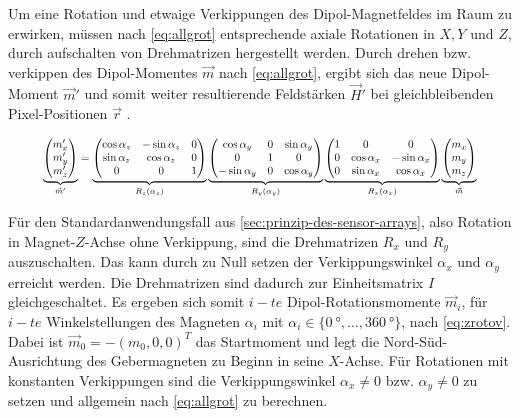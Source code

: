 \clearpage


Um eine Rotation und etwaige Verkippungen des Dipol-Magnetfeldes im Raum zu erwirken, müssen nach \autoref{eq:allgrot} entsprechende axiale Rotationen in $X,Y$ und $Z$, durch aufschalten von Drehmatrizen hergestellt werden. Durch drehen bzw. verkippen des Dipol-Momentes $\vec{m}$ nach \autoref{eq:allgrot}, ergibt sich das neue Dipol-Moment $\vec{m}'$ und somit weiter resultierende Feldstärken $\vec{H}'$ bei gleichbleibenden Pixel-Positionen $\vec{r}$ \cite{Schuethe2019}.


\begin{equation}\label{eq:allgrot}
\resizebox{.9\linewidth}{!}{$%
	\underbrace{
		\begin{pmatrix}
			 m_x' \\
			 m_y' \\
			 m_z' 
		\end{pmatrix}
	}_{\vec{m}'}  =
	\underbrace{
		\begin{pmatrix}
			\cos\alpha_z & -\sin\alpha_z & 0 \\
			\sin\alpha_z &  \cos\alpha_z & 0 \\
			0			 & 0			 & 1
		\end{pmatrix}
	}_{R_z(\alpha_z)}
	\underbrace{
		\begin{pmatrix}
			\cos\alpha_y  & 0 & \sin\alpha_y \\
			0 		      & 1 & 0 \\
			-\sin\alpha_y & 0 & \cos\alpha_y
		\end{pmatrix}
	}_{R_y(\alpha_y)}
	\underbrace{
		\begin{pmatrix}
			1 & 0 			 & 0 \\
			0 & \cos\alpha_x & -\sin\alpha_x \\
			0 & \sin\alpha_x &  \cos\alpha_x 
		\end{pmatrix}
	}_{R_x(\alpha_x)}
	\underbrace{
		\begin{pmatrix}
			m_x \\
			m_y \\
			m_z
		\end{pmatrix}
	}_{\vec{m}}$%
}
\end{equation}


Für den Standardanwendungsfall aus \autoref{sec:prinzip-des-sensor-arrays}, also Rotation in Magnet-$Z$-Achse ohne Verkippung, sind die Drehmatrizen $R_x$ und $R_y$ auszuschalten. Das kann durch zu Null setzen der Verkippungswinkel $\alpha_x$ und $\alpha_y$ erreicht werden. Die Drehmatrizen sind dadurch zur Einheitsmatrix $I$ gleichgeschaltet. Es ergeben sich somit $i-te$ Dipol-Rotationsmomente $\vec{m}_i$, für $i-te$ Winkelstellungen des Magneten $\alpha_i$ mit $\alpha_i\in\{\SI{0}{\degree},\ldots,\SI{360}{\degree}\}$, nach \autoref{eq:zrotov}. Dabei ist $\vec{m}_0 = -(m_0,0,0)^T$ das Startmoment und legt die Nord-Süd-Ausrichtung des Gebermagneten zu Beginn in seine $X$-Achse. Für Rotationen mit konstanten Verkippungen sind die Verkippungswinkel $\alpha_x \ne 0$ bzw. $\alpha_y \ne 0$ zu setzen und allgemein nach \autoref{eq:allgrot} zu berechnen. 


